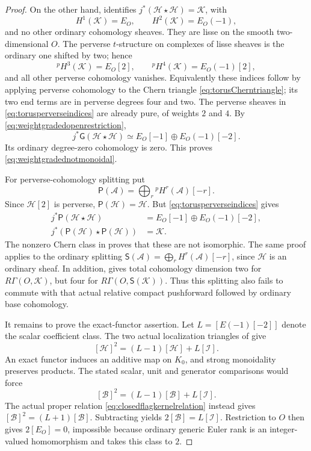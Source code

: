 \begin{proof}
On the other hand,  identifies
\(j^*(\mathcal H\star\mathcal H)=\mathcal K\), with
\[
 H^1(\mathcal K)=E_O,\qquad
 H^2(\mathcal K)=E_O(-1),
\]
and no other ordinary cohomology sheaves. They are lisse on
the smooth two-dimensional \(O\). The perverse \(t\)-structure
on complexes of lisse sheaves is the ordinary one shifted by
two; hence
\begin{equation}\label{eq:torusperverseindices}
 {}^pH^3(\mathcal K)=E_O[2],\qquad
 {}^pH^4(\mathcal K)=E_O(-1)[2],
\end{equation}
and all other perverse cohomology vanishes. Equivalently these
indices follow by applying perverse cohomology to the Chern
triangle \eqref{eq:torusCherntriangle}; its two end terms
are in perverse degrees four and two. The perverse sheaves
in \eqref{eq:torusperverseindices} are already pure, of weights
\(2\) and \(4\). By
\eqref{eq:weightgradedopenrestriction},
\begin{equation}\label{eq:weightgradedproductrestriction}
 j^*\mathsf G(\mathcal H\star\mathcal H)
       \simeq E_O[-1]\oplus E_O(-1)[-2].
\end{equation}
Its ordinary degree-zero cohomology is zero. This proves
\eqref{eq:weightgradednotmonoidal}.

For perverse-cohomology splitting put
\[
       \mathsf P(\mathcal A)=
            \bigoplus_r{}^pH^r(\mathcal A)[-r].
\]
Since \(\mathcal H[2]\) is perverse,
\(\mathsf P(\mathcal H)=\mathcal H\). But
\eqref{eq:torusperverseindices} gives
\[
 \begin{split}
 j^*\mathsf P(\mathcal H\star\mathcal H)
   &=E_O[-1]\oplus E_O(-1)[-2],\\
 j^*(\mathsf P(\mathcal H)\star\mathsf P(\mathcal H))
   &=\mathcal K.
 \end{split}
\]
The nonzero Chern class in  proves that these are
not isomorphic. The same proof applies to the ordinary
splitting \(\mathsf S(\mathcal A)=\bigoplus_r
H^r(\mathcal A)[-r]\), since \(\mathcal H\) is an ordinary
sheaf. In addition,  gives total cohomology dimension
two for \(R\Gamma(O,\mathcal K)\), but four for
\(R\Gamma(O,\mathsf S(\mathcal K))\). Thus this splitting
also fails to commute with that actual relative compact
pushforward followed by ordinary base cohomology.

It remains to prove the exact-functor assertion.
Let \(L=[E(-1)[-2]]\) denote the scalar coefficient class.
The two actual localization triangles of  give
\begin{equation}\label{eq:openflagKzerorelation}
       [\mathcal H]^2=(L-1)[\mathcal H]+L[\mathcal I].
\end{equation}
An exact functor induces an additive map on \(K_0\), and
strong monoidality preserves products. The stated scalar,
unit and generator comparisons would force
\[
        [\mathcal B]^2=(L-1)[\mathcal B]+L[\mathcal I].
\]
The actual proper relation
\eqref{eq:closedflagkernelrelation} instead gives
\([\mathcal B]^2=(L+1)[\mathcal B]\). Subtracting yields
\(2[\mathcal B]=L[\mathcal I]\). Restriction to \(O\)
then gives \(2[E_O]=0\), impossible because ordinary
generic Euler rank is an integer-valued homomorphism and
takes this class to \(2\).
\end{proof}

